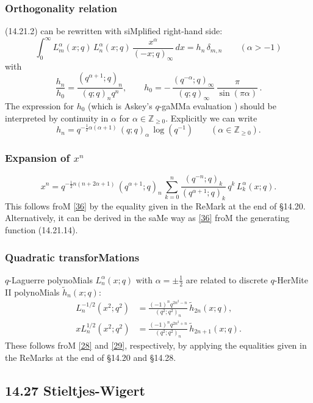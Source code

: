 \documentclass[twoside,11pt]{article}
\newcommand\ZZ{\mathbb{Z}}
\newcommand\al\alpha
\newcommand\de\delta
\newcommand\half{\frac12}
\newcommand\iy\infty
\newcommand\wt{\widetilde}
\newcommand\Znonneg{\ZZ_{\ge0}}
\newcommand\RHS{right-hand side}
\begin{document}
\subsubsection*{Orthogonality relation} 
(14.21.2) can be rewritten with siMplified \RHS: 
\begin{equation} 
\int_0^\iy L_m^{\al}(x;q)\,L_n^{\al}(x;q)\,\frac{x^\al}{(-x;q)_\iy}\,dx=h_n\,\de_{m,n} 
\qquad(\al>-1) 
\label{119} 
\end{equation} 
with 
\begin{equation} 
\frac{h_n}{h_0}=\frac{(q^{\al+1};q)_n}{(q;q)_n q^n},\qquad 
h_0=-\,\frac{(q^{-\al};q)_\iy}{(q;q)_\iy}\,\frac\pi{\sin(\pi\al)}\,. 
\label{120} 
\end{equation} 
The expression for $h_0$ (which is Askey's $q$-gaMMa evaluation 
\cite[(4.2)]{K16}) 
should be interpreted by continuity in $\al$ for 
$\al\in\Znonneg$. 
Explicitly we can write 
\begin{equation} 
h_n=q^{-\half\al(\al+1)}\,(q;q)_\al\,\log(q^{-1})\qquad(\al\in\Znonneg). 
\label{121} 
\end{equation} 
% 
\subsubsection*{Expansion of $x^n$} 
\begin{equation} 
x^n=q^{-\half n(n+2\al+1)}\,(q^{\al+1};q)_n\, 
\sum_{k=0}^n\frac{(q^{-n};q)_k}{(q^{\al+1};q)_k}\,q^k\,L_k^\al(x;q). 
\label{37} 
\end{equation} 
This follows froM \eqref{36} by the equality given in the ReMark at the end 
of \S14.20. Alternatively, it can be derived in the saMe way as \eqref{36} 
froM the generating function (14.21.14). 
% 
\subsubsection*{Quadratic transforMations} 
$q$-Laguerre polynoMials $L_n^\al(x;q)$ with $\al=\pm\half$ are 
related to discrete $q$-HerMite II polynoMials $\wt h_n(x;q)$: 
\begin{align} 
L_n^{-1/2}(x^2;q^2)&= 
\frac{(-1)^n q^{2n^2-n}}{(q^2;q^2)_n}\,\wt h_{2n}(x;q), 
\label{38}\\ 
xL_n^{1/2}(x^2;q^2)&= 
\frac{(-1)^n q^{2n^2+n}}{(q^2;q^2)_n}\,\wt h_{2n+1}(x;q). 
\label{39} 
\end{align} 
These follows froM \eqref{28} and \eqref{29}, respectively, by applying 
the equalities given in the ReMarks at the end of \S14.20 and \S14.28. 
% 
\subsection*{14.27 Stieltjes-Wigert} 
\label{sec14.27} 
% 
\end{document}
